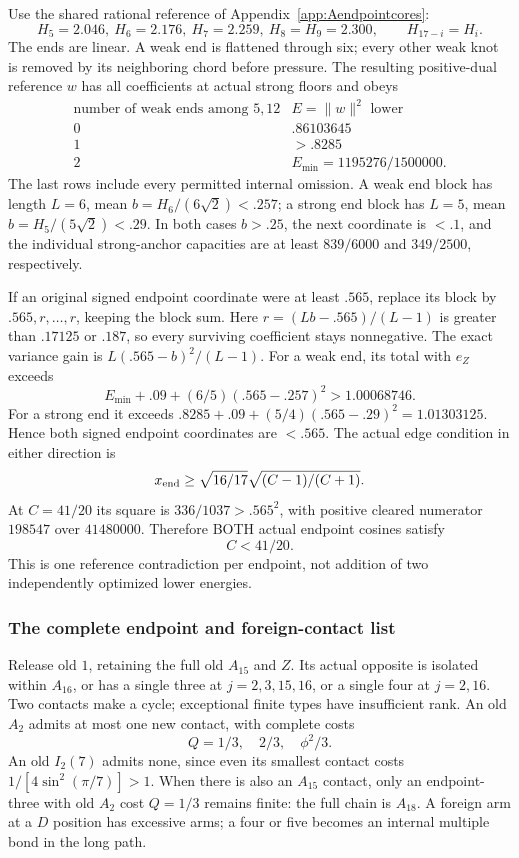 \documentclass[11pt]{article}
\theoremstyle{definition}
\theoremstyle{remark}
\newcommand{\norm}[1]{\lVert #1\rVert}
\begin{document}
Use the shared rational reference of Appendix~\ref{app:Aendpointcores}:
\[
 H_5=2.046,\ H_6=2.176,\ H_7=2.259,\ H_8=H_9=2.300,
 \qquad H_{17-i}=H_i.
\]
The ends are linear.  A weak end is flattened through six; every
other weak knot is removed by its neighboring chord before pressure.
The resulting positive-dual reference \(w\) has all coefficients at
actual strong floors and obeys
\[
\begin{array}{c|c}
 \text{number of weak ends among }5,12&E=\norm w^2\text{ lower}\\ \hline
 0&.86103645\\
 1&>.8285\\
 2&E_{\min}=1195276/1500000 .
\end{array}                                                   \tag{T3}
\]
The last rows include every permitted internal omission.
A weak end block has length \(L=6\), mean
\(b=H_6/(6\sqrt2)<.257\); a strong end block has \(L=5\),
mean \(b=H_5/(5\sqrt2)<.29\).  In both cases \(b>.25\),
the next coordinate is \(<.1\), and the individual strong-anchor
capacities are at least \(839/6000\) and \(349/2500\), respectively.

If an original signed endpoint coordinate were at least \(.565\),
replace its block by \(.565,r,\ldots,r\), keeping the block sum.
Here \(r=(Lb-.565)/(L-1)\) is greater than \(.17125\) or
\(.187\), so every surviving coefficient stays nonnegative.
The exact variance gain is \(L(.565-b)^2/(L-1)\).
For a weak end, its total with \(e_Z\) exceeds
\[
 E_{\min}+.09+(6/5)(.565-.257)^2>1.00068746.
\]
For a strong end it exceeds
\(.8285+.09+(5/4)(.565-.29)^2=1.01303125\).
Hence both signed endpoint coordinates are \(<.565\).
The actual edge condition in either direction is
\[
 x_{\rm end}\ge\sqrt{16/17}\sqrt{(C-1)/(C+1)}.
\]
At \(C=41/20\) its square is \(336/1037>.565^2\), with
positive cleared numerator \(198547\) over \(41480000\).
Therefore BOTH actual endpoint cosines satisfy
\[
                         C<41/20.                         \tag{T4}
\]
This is one reference contradiction per endpoint, not addition of
two independently optimized lower energies.

\subsubsection{The complete endpoint and foreign-contact list}
Release old \(1\), retaining the full old \(A_{15}\) and \(Z\).
Its actual opposite is isolated within \(A_{16}\), or has a single
three at \(j=2,3,15,16\), or a single four at \(j=2,16\).
Two contacts make a cycle; exceptional finite types have insufficient rank.
An old \(A_2\) admits at most one new contact, with complete costs
\[
                  Q=1/3,\quad2/3,\quad\phi^2/3.
\]
An old \(I_2(7)\) admits none, since even its smallest contact costs
\(1/[4\sin^2(\pi/7)]>1\).
When there is also an \(A_{15}\) contact, only an endpoint-three
with old \(A_2\) cost \(Q=1/3\) remains finite: the full chain
is \(A_{18}\).  A foreign arm at a \(D\) position has excessive
arms; a four or five becomes an internal multiple bond in the long path.
\end{document}
